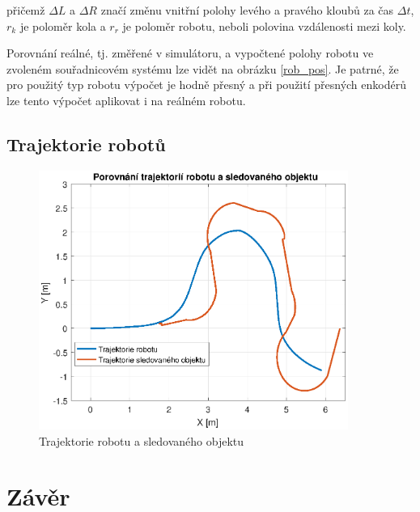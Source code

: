 \documentclass[twoside]{ctuthesis}
\theoremstyle{plain}
\theoremstyle{definition}
\theoremstyle{note}
\begin{document}
přičemž  $\Delta L$ a $\Delta R$ značí změnu vnitřní polohy levého a pravého kloubů za čas $\Delta t$, $r_k$ je poloměr kola a $r_r$ je poloměr robotu, neboli polovina vzdálenosti mezi koly.

Porovnání reálné, tj. změřené v simulátoru, a vypočtené polohy robotu ve zvoleném souřadnicovém systému lze vidět na obrázku \ref{rob_pos}. Je patrné, že pro použitý typ robotu výpočet je hodně přesný a při použití přesných enkodérů lze tento výpočet aplikovat i na reálném robotu.

\section{Trajektorie robotů}


\begin{figure}
	\caption{Trajektorie robotu a sledovaného objektu}
	
	\label{trajektorie}
	\includegraphics[width=0.9\textwidth]{images/5/trajektorie.eps}
\end{figure}
\chapter{Závěr}
\appendix

\printindex

%
%
\end{document}
